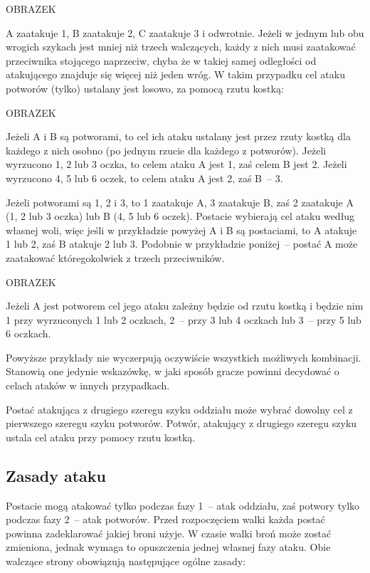OBRAZEK

A zaatakuje 1, B zaatakuje 2, C zaatakuje 3 i odwrotnie.
Jeżeli w jednym lub obu wrogich szykach jest mniej niż trzech walczących, każdy z nich musi zaatakować przeciwnika stojącego naprzeciw, chyba że w takiej samej odległości od atakującego znajduje się więcej niż jeden wróg.
W takim przypadku cel ataku potworów (tylko) ustalany jest losowo, za pomocą rzutu kostką:

OBRAZEK

Jeżeli A i B są potworami, to cel ich ataku ustalany jest przez rzuty kostką dla każdego z nich osobno (po jednym rzucie dla każdego z potworów).
Jeżeli wyrzucono 1, 2 lub 3 oczka, to celem ataku A jest 1, zaś celem B jest 2.
Jeżeli wyrzucono 4, 5 lub 6 oczek, to celem ataku A jest 2, zaś B~-- 3.

Jeżeli potworami są 1, 2 i 3, to 1 zaatakuje A, 3 zaatakuje B, zaś 2 zaatakuje A (1, 2 lub 3 oczka) lub B (4, 5 lub 6 oczek).
Postacie wybierają cel ataku według własnej woli, więc jeśli w przykładzie powyżej A i B są postaciami, to A atakuje 1 lub 2, zaś B atakuje 2 lub 3.
Podobnie w przykładzie poniżej~-- postać A może zaatakować któregokolwiek z trzech przeciwników.

OBRAZEK

Jeżeli A jest potworem cel jego ataku zależny będzie od rzutu kostką i będzie nim 1 przy wyrzuconych 1 lub 2 oczkach, 2~-- przy 3 lub 4 oczkach lub 3~-- przy 5 lub 6 oczkach.

Powyższe przykłady nie wyczerpują oczywiście wszystkich możliwych kombinacji.
Stanowią one jedynie wskazówkę, w jaki sposób gracze powinni decydować o celach ataków w innych przypadkach.

Postać atakująca z drugiego szeregu szyku oddziału może wybrać dowolny cel z pierwszego szeregu szyku potworów.
Potwór, atakujący z drugiego szeregu szyku ustala cel ataku przy pomocy rzutu kostką.

\subsection{Zasady ataku}

Postacie mogą atakować tylko podczas fazy 1~-- atak oddziału, zaś potwory tylko podczas fazy 2~-- atak potworów.
Przed rozpoczęciem walki każda postać powinna zadeklarować jakiej broni użyje.
W czasie walki broń może zostać zmieniona, jednak wymaga to opuszczenia jednej własnej fazy ataku.
Obie walczące strony obowiązują następujące ogólne zasady:

